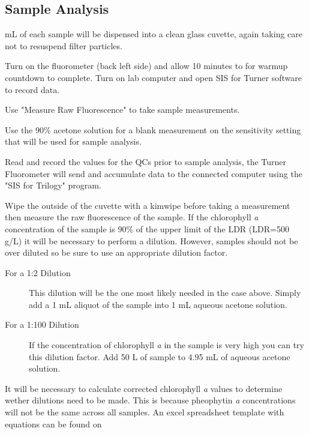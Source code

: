 \documentclass[12pt]{../SOP3_alpha}
\begin{document}

\subsection*{Sample Analysis}

 mL of each sample will be dispensed into a clean glass cuvette, again taking care not to resuspend filter particles.

\NP Turn on the fluorometer (back left side) and allow 10 minutes to for warmup countdown to complete. Turn on lab computer and open SIS for Turner software to record data. 

\NP Use "Measure Raw Fluorescence" to take sample measurements.

\NP Use the 90\% acetone solution for a blank measurement on the sensitivity setting that will be used for sample analysis. %

\NP Read and record the values for the QCs prior to sample analysis, the Turner Fluorometer will send and accumulate data to the connected computer using the "SIS for Trilogy" program.

\NP Wipe the outside of the cuvette with a kimwipe before taking a measurement then measure the raw fluorescence of the sample. If the chlorophyll \textit{a} concentration of the sample is 90\% of the upper limit of the LDR (LDR=500 \micro g/L) it will be necessary to perform a dilution. However, samples should not be over diluted so be sure to use an appropriate dilution factor. 

\begin{description} 
\item[For a 1:2 Dilution] This dilution will be the one most likely needed in the case above. Simply add a 1 mL aliquot of the sample into 1 mL aqueous acetone solution.
\item[For a 1:100 Dilution] If the concentration of chlorophyll \textit{a} in the sample is very high you can try this dilution factor. Add 50 \micro L of sample to 4.95 mL of aqueous acetone solution. 
\end{description}

\NP It will be necessary to calculate corrected chlorophyll \textit{a} values to determine wether dilutions need to be made. This is because pheophytin \textit{a} concentrations will not be the same across all samples. An excel spreadsheet template with equations can be found on %
\end{document}
